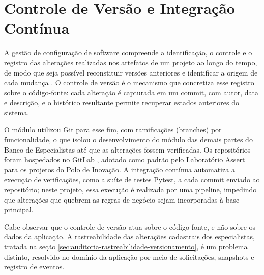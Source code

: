 \section{Controle de Versão e Integração Contínua}
\label{sec:controle-versao-integracao-continua}

A gestão de configuração de software compreende a identificação, o controle e o registro das
alterações realizadas nos artefatos de um projeto ao longo do tempo, de modo que seja possível
reconstituir versões anteriores e identificar a origem de cada mudança \cite{sommerville2011}. O
controle de versão é o mecanismo que concretiza esse registro sobre o código-fonte: cada
alteração é capturada em um commit, com autor, data e descrição, e o histórico resultante
permite recuperar estados anteriores do sistema.

O módulo utilizou Git \cite{git2026} para esse fim, com ramificações (branches) por
funcionalidade, o que isolou o desenvolvimento do módulo das demais partes do Banco de
Especialistas até que as alterações fossem verificadas. Os repositórios foram hospedados no
GitLab \cite{gitlab2026}, adotado como padrão pelo Laboratório Assert para os projetos do Polo
de Inovação. A integração contínua automatiza a execução de verificações, como a suíte de
testes Pytest, a cada commit enviado ao repositório; neste projeto, essa execução é realizada
por uma pipeline, impedindo que alterações que quebrem as regras de negócio sejam incorporadas à
base principal.


Cabe observar que o controle de versão atua sobre o código-fonte, e não sobre os dados da
aplicação. A rastreabilidade das alterações cadastrais dos especialistas, tratada na seção \ref{sec:auditoria-rastreabilidade-versionamento},
é um problema distinto, resolvido no domínio da aplicação por meio de solicitações,
snapshots e registro de eventos.
